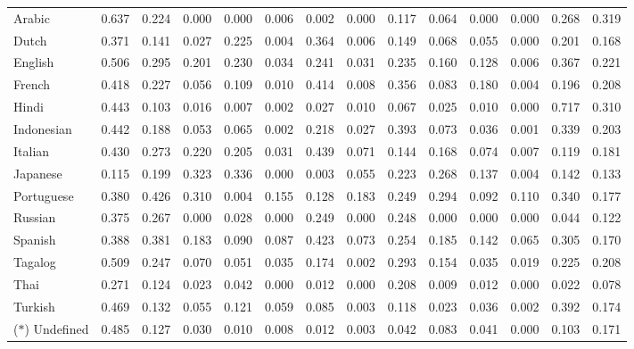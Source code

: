 {\begin{tabular}{lccccccccccccr}
Arabic & 0.637 & 0.224 & 0.000 & 0.000 & 0.006 & 0.002 & 0.000 & 0.117 & 0.064 & 0.000 &  0.000 & 0.268 & 0.319 \\ 
Dutch & 0.371 & 0.141 & 0.027 & 0.225 & 0.004 & 0.364 & 0.006 & 0.149 & 0.068 & 0.055 & 0.000 & 0.201 & 0.168 \\ 
English & 0.506 & 0.295 & 0.201 & 0.230 & 0.034 & 0.241 & 0.031 & 0.235 & 0.160 & 0.128 & 0.006 & 0.367 & 0.221  \\  
French & 0.418 & 0.227 & 0.056 & 0.109 & 0.010 & 0.414 & 0.008 & 0.356 & 0.083 & 0.180 & 0.004 & 0.196 & 0.208 \\ 
Hindi & 0.443 & 0.103 & 0.016 & 0.007 & 0.002 & 0.027 & 0.010 & 0.067 & 0.025 & 0.010 & 0.000 & 0.717 & 0.310 \\ 
Indonesian & 0.442 & 0.188 & 0.053 & 0.065 & 0.002 & 0.218 & 0.027 & 0.393 & 0.073 & 0.036 & 0.001 & 0.339 & 0.203 \\ 
Italian & 0.430 & 0.273 & 0.220 & 0.205 & 0.031 & 0.439 & 0.071 & 0.144 & 0.168 & 0.074 & 0.007 & 0.119 & 0.181  \\ 
Japanese & 0.115 & 0.199 & 0.323 & 0.336 & 0.000 & 0.003 & 0.055 & 0.223 & 0.268 & 0.137 & 0.004 & 0.142 & 0.133  \\ 
Portuguese & 0.380 & 0.426 & 0.310 & 0.004 & 0.155 & 0.128 & 0.183 & 0.249 & 0.294 & 0.092 & 0.110 & 0.340 & 0.177 \\  
Russian & 0.375 & 0.267 & 0.000 & 0.028 & 0.000 & 0.249 & 0.000 & 0.248 & 0.000 & 0.000 & 0.000 & 0.044 & 0.122  \\
Spanish & 0.388 & 0.381 & 0.183 & 0.090 & 0.087 & 0.423 & 0.073 & 0.254 & 0.185 & 0.142 & 0.065 & 0.305 & 0.170 \\ 
Tagalog & 0.509 & 0.247 & 0.070 & 0.051 & 0.035 & 0.174 & 0.002 & 0.293 & 0.154 & 0.035 & 0.019 & 0.225 & 0.208 \\ 
Thai & 0.271 & 0.124 & 0.023 & 0.042 & 0.000 & 0.012 & 0.000 & 0.208 & 0.009 & 0.012 & 0.000 & 0.022 & 0.078 \\ 
Turkish & 0.469 & 0.132 & 0.055 & 0.121 & 0.059 & 0.085 & 0.003 & 0.118 & 0.023 & 0.036 & 0.002 & 0.392 & 0.174 \\ 
\rule{0pt}{1em}($*$) Undefined & 0.485 & 0.127 & 0.030 & 0.010 & 0.008 & 0.012 & 0.003 & 0.042 & 0.083 & 0.041 & 0.000 & 0.103 & 0.171  \\  
\bottomrule
\end{tabular}
}
